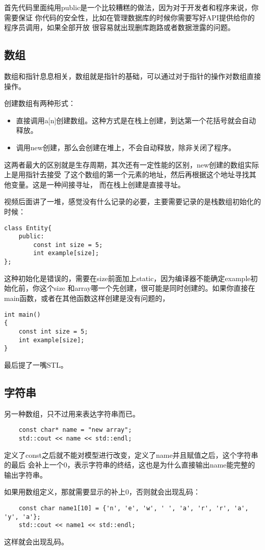\documentclass{article}
\begin{document}
\begin{sloppypar}
首先代码里面纯用public是一个比较糟糕的做法，因为对于开发者和程序来说，你需要保证
你代码的安全性，比如在管理数据库的时候你需要写好API提供给你的程序员调用，如果全部开放
很容易就出现删库跑路或者数据泄露的问题。

\subsection{数组}
数组和指针息息相关，数组就是指针的基础，可以通过对于指针的操作对数组直接操作。

创建数组有两种形式：
\begin{itemize}
	\item 直接调用a[n]创建数组。这种方式是在栈上创建，到达第一个花括号就会自动释放。
	\item 调用new创建，那么会创建在堆上，不会自动释放，除非关闭了程序。
\end{itemize}
这两者最大的区别就是生存周期，其次还有一定性能的区别，new创建的数组实际上是用指针去接受
了这个数组的第一个元素的地址，然后再根据这个地址寻找其他变量。这是一种间接寻址，
而在栈上创建是直接寻址。

视频后面讲了一堆，感觉没有什么记录的必要，主要需要记录的是栈数组初始化的时候：
\begin{lstlisting}
class Entity{
    public:
        const int size = 5;
        int example[size];
};
\end{lstlisting}
这种初始化是错误的，需要在size前面加上static，因为编译器不能确定example初始化前，你这个size
和array哪一个先创建，很可能是同时创建的。如果你直接在main函数，或者在其他函数这样创建是没有问题的，
\begin{lstlisting}
int main()
{   
    const int size = 5;
    int example[size];
}
\end{lstlisting}
最后提了一嘴STL。

\subsection{字符串}
另一种数组，只不过用来表达字符串而已。
\begin{lstlisting}
	const char* name = "new array";
    std::cout << name << std::endl;
\end{lstlisting}
定义了const之后就不能对模型进行改变，定义了name并且赋值之后，这个字符串的最后
会补上一个0，表示字符串的终结，这也是为什么直接输出name能完整的输出字符串。

如果用数组定义，那就需要显示的补上0，否则就会出现乱码：
\begin{lstlisting}
    const char name1[10] = {'n', 'e', 'w', ' ', 'a', 'r', 'r', 'a', 'y', 'a'};
    std::cout << name1 << std::endl;
\end{lstlisting}
这样就会出现乱码。


\end{sloppypar}
\end{document}
